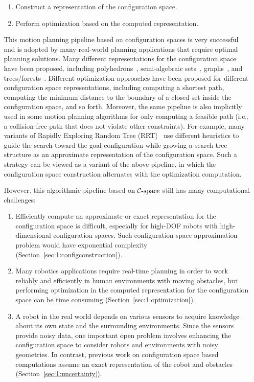 \begin{enumerate}
\item Construct a representation of the configuration space.
\item Perform optimization based on the computed representation.
\end{enumerate}

This motion planning pipeline based on configuration spaces is very successful and is adopted by many real-world planning applications that require optimal planning solutions. Many different representations for the configuration space have been proposed, including polyhedrons~\cite{Chazelle:ADS:1987}, semi-algebraic sets~\cite{Canny:1988:AGC,Canny:1988:CKP}, graphs~\cite{Kavraki96}, and trees/forests~\cite{Kuffner00}. Different optimization approaches have been proposed for different configuration space representations, including computing a shortest path, computing the minimum distance to the boundary of a closed set inside the configuration space, and so forth. Moreover, the same pipeline is also implicitly used in some motion planning algorithms for only computing a feasible path (i.e., a collision-free path that does not violate other constraints). For example, many variants of Rapidly Exploring Random Tree (RRT)~\cite{Kuffner00} use different heuristics to guide the search toward the goal configuration while growing a search tree structure as an approximate representation of the configuration space. Such a strategy can be viewed as a variant of the above pipeline, in which the configuration space construction alternates with the optimization computation.


However, this algorithmic pipeline based on $\mathcal C\text{-space}$ still has many computational challenges:
\begin{enumerate}
\item Efficiently compute an approximate or exact representation for the configuration space is difficult, especially for high-DOF robots with high-dimensional configuration spaces. Such configuration space approximation problem would have exponential complexity (Section~\ref{sec:1:configconstruction}).
\item Many robotics applications require real-time planning in order to work reliably and efficiently in human environments with moving obstacles, but performing optimization in the computed representation for the configuration space can be time consuming (Section~\ref{sec:1:optimization}).
\item A robot in the real world depends on various sensors to acquire knowledge about its own state and the surrounding environments. Since the sensors provide noisy data, one important open problem involves enhancing the configuration space to consider robots and environments with noisy geometries. In contrast, previous work on configuration space based computations assume an exact representation of the robot and obstacles (Section~\ref{sec:1:uncertainty}).
\end{enumerate}


